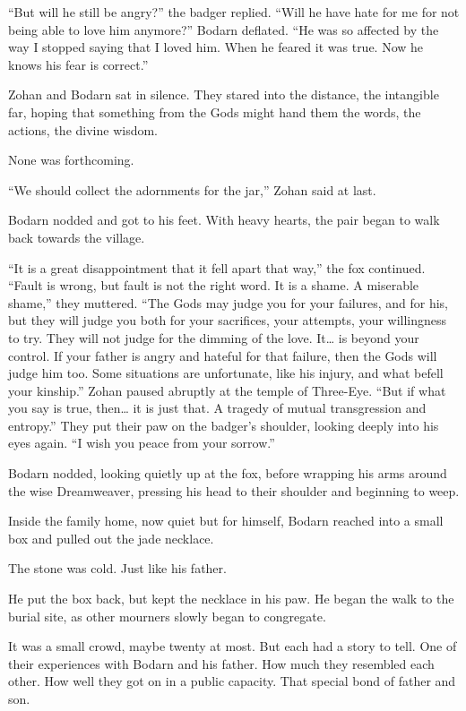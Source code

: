 ``But will he still be angry?'' the badger replied. ``Will he have hate for me for not being able to love him anymore?'' Bodarn deflated. ``He was so affected by the way I stopped saying that I loved him. When he feared it was true. Now he knows his fear is correct.''

Zohan and Bodarn sat in silence. They stared into the distance, the intangible far, hoping that something from the Gods might hand them the words, the actions, the divine wisdom.

None was forthcoming.

``We should collect the adornments for the jar,'' Zohan said at last.

Bodarn nodded and got to his feet. With heavy hearts, the pair began to walk back towards the village.

``It is a great disappointment that it fell apart that way,'' the fox continued. ``Fault is wrong, but fault is not the right word. It is a shame. A miserable shame,'' they muttered. ``The Gods may judge you for your failures, and for his, but they will judge you both for your sacrifices, your attempts, your willingness to try. They will not judge for the dimming of the love. It\ldots{} is beyond your control. If your father is angry and hateful for that failure, then the Gods will judge him too. Some situations are unfortunate, like his injury, and what befell your kinship.'' Zohan paused abruptly at the temple of Three-Eye. ``But if what you say is true, then\ldots{} it is just that. A tragedy of mutual transgression and entropy.'' They put their paw on the badger's shoulder, looking deeply into his eyes again. ``I wish you peace from your sorrow.''

Bodarn nodded, looking quietly up at the fox, before wrapping his arms around the wise Dreamweaver, pressing his head to their shoulder and beginning to weep.

\secdiv

\noindent Inside the family home, now quiet but for himself, Bodarn reached into a small box and pulled out the jade necklace.

The stone was cold. Just like his father.

He put the box back, but kept the necklace in his paw. He began the walk to the burial site, as other mourners slowly began to congregate.

It was a small crowd, maybe twenty at most. But each had a story to tell. One of their experiences with Bodarn and his father. How much they resembled each other. How well they got on in a public capacity. That special bond of father and son.

